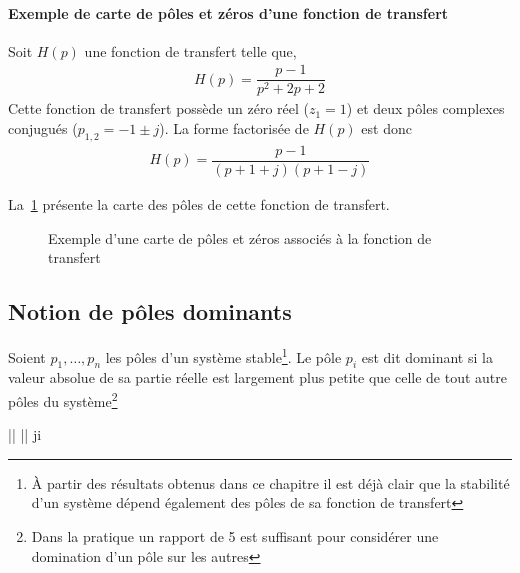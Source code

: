 \paragraph{Exemple de carte de pôles et zéros d'une fonction de transfert}

Soit $H(p)$ une fonction de transfert telle que,
\begin{align}
H(p)=\dfrac{p-1}{p^2+2p+2}\label{eq-ft_carte}
\end{align}
Cette fonction de transfert possède un zéro réel ($z_1=1$) et deux 
pôles complexes conjugués ($p_{1,2}=-1\pm j$).
La forme factorisée de $H(p)$ est donc
\begin{align} 
    H(p)=\dfrac{p-1}{(p+1+j)(p+1-j)}
\end{align}

La~\cref{fig-carte} présente la carte des pôles de cette fonction de transfert.
\begin{figure}[!h]
    \begin{center}
    
\end{center}
\caption{Exemple d'une carte de pôles et zéros associés 
    à la fonction de transfert~\label{fig-carte} }
\end{figure}

\subsection{Notion de pôles dominants}

Soient $p_1,\ldots,p_n$ les pôles d'un système stable\footnote{À partir 
des résultats obtenus dans ce chapitre il est déjà clair que la stabilité
d'un système dépend également des pôles de sa fonction de transfert}.
Le pôle $p_i$ est dit dominant si la valeur absolue
de sa partie réelle est largement plus petite que celle de tout autre pôles 
du système\footnote{Dans la pratique un rapport de 5 est 
suffisant pour considérer une domination d'un pôle sur les autres}
\begin{bequation}
	\big|\big| \ll \big|\big|\;\; \forall j\neq i
\end{bequation}

